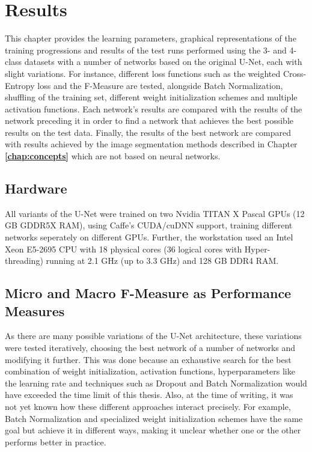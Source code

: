 \chapter {Results}
\label{chap:results}

This chapter provides the learning parameters, graphical representations of the training progressions and results of the test runs performed using the 3- and 4-class datasets with a number of networks based on the original U-Net, each with slight variations. For instance, different loss functions such as the weighted Cross-Entropy loss and the F-Measure are tested, alongside Batch Normalization, shuffling of the training set, different weight initialization schemes and multiple activation functions. Each network's results are compared with the results of the network preceding it in order to find a network that achieves the best possible results on the test data. Finally, the results of the best network are compared with results achieved by the image segmentation methods described in Chapter \textbf{\ref{chap:concepts}} which are not based on neural networks.

	\section{Hardware}
All variants of the U-Net were trained on two Nvidia TITAN X Pascal GPUs (12 GB GDDR5X RAM), using Caffe's CUDA/cuDNN support, training different networks seperately on different GPUs. Further, the workstation used an Intel Xeon E5-2695 CPU with 18 physical cores (36 logical cores with Hyper-threading) running at 2.1 GHz (up to 3.3 GHz) and 128 GB DDR4 RAM.

	\section {Micro and Macro F-Measure as Performance Measures}

\noindent As there are many possible variations of the U-Net architecture, these variations were tested iteratively, choosing the best network of a number of networks and modifying it further. This was done because an exhaustive search for the best combination of weight initialization, activation functions, hyperparameters like the learning rate and techniques such as Dropout and Batch Normalization would have exceeded the time limit of this thesis. Also, at the time of writing, it was not yet known how these different approaches interact precisely. For example, Batch Normalization and specialized weight initialization schemes have the same goal but achieve it in different ways, making it unclear whether one or the other performs better in practice.\\


